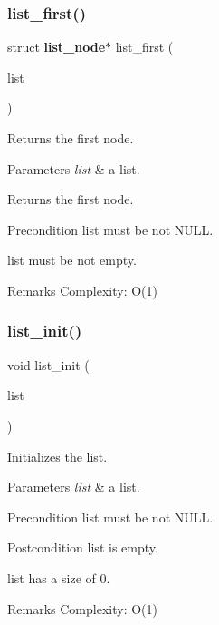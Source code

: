 \subsubsection{list\+\_\+first()}
{\footnotesize\ttfamily struct \textbf{ list\+\_\+node}$\ast$ list\+\_\+first (\begin{DoxyParamCaption}\item[{const struct \textbf{ list} $\ast$}]{list }\end{DoxyParamCaption})}

Returns the first node.


\begin{DoxyParams}{Parameters}
{\em list} & a list. \\
\hline
\end{DoxyParams}
\begin{DoxyReturn}{Returns}
the first node.
\end{DoxyReturn}
\begin{DoxyPrecond}{Precondition}
{\ttfamily list} must be not N\+U\+LL. 

{\ttfamily list} must be not empty.
\end{DoxyPrecond}
\begin{DoxyRemark}{Remarks}
Complexity\+: O(1) 
\end{DoxyRemark}
\mbox{\label{list_8h_a8aa862d10f52f7b0348fce990c7c12db}} 
\subsubsection{list\+\_\+init()}
{\footnotesize\ttfamily void list\+\_\+init (\begin{DoxyParamCaption}\item[{struct \textbf{ list} $\ast$}]{list }\end{DoxyParamCaption})\hspace{0.3cm}{\ttfamily [inline]}}

Initializes the list.


\begin{DoxyParams}{Parameters}
{\em list} & a list.\\
\hline
\end{DoxyParams}
\begin{DoxyPrecond}{Precondition}
{\ttfamily list} must be not N\+U\+LL.
\end{DoxyPrecond}
\begin{DoxyPostcond}{Postcondition}
{\ttfamily list} is empty. 

{\ttfamily list} has a size of 0.
\end{DoxyPostcond}
\begin{DoxyRemark}{Remarks}
Complexity\+: O(1) 
\end{DoxyRemark}
\mbox{\label{list_8h_aac5b9656592776dd99c192c7c8f2b18f}} 
